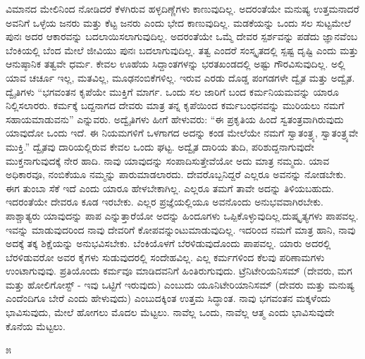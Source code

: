 ವಿಮಾನದ ಮೇಲಿನಿಂದ ನೋಡಿದರೆ ಕೆಳಗಿರುವ ಹಳ್ಳದಿಣ್ಣೆಗಳು ಕಾಣುವುದಿಲ್ಲ. ಅದರಂತೆಯೇ ಮನುಷ್ಯ ಉತ್ತಮನಾದರೆ ಅವನಿಗೆ ಒಳ್ಳೆಯ ಜನರು ಮತ್ತು ಕೆಟ್ಟ ಜನರು ಎಂದು ಭೇದ ಕಾಣುವುದಿಲ್ಲ. ಮಡಕೆಯನ್ನು ಒಂದು ಸಲ ಸುಟ್ಟಮೇಲೆ ಪುನಃ ಅದರ ಆಕಾರವನ್ನು ಬದಲಾಯಿಸಲಾಗುವುದಿಲ್ಲ. ಅದರಂತೆಯೇ ಒಮ್ಮೆ ದೇವರ ಸ್ಪರ್ಶವನ್ನು ಪಡೆದು ಜ್ಞಾನವೆಂಬ ಬೆಂಕಿಯಲ್ಲಿ ಬೆಂದ ಮೇಲೆ ಜೀವಿಯು ಪುನಃ ಬದಲಾಗುವುದಿಲ್ಲ. ತತ್ವ ಎಂದರೆ ಸಂಸ್ಕೃತದಲ್ಲಿ ಸ್ಪಷ್ಟ ದೃಷ್ಟಿ ಎಂದು ಮತ್ತು ಆನುಷ್ಠಾನಿಕ ತತ್ವವೇ ಧರ್ಮ. ಕೇವಲ ಊಹೆಯ ಸಿದ್ದಾಂತಗಳನ್ನು ಭರತಖಂಡದಲ್ಲಿ ಅಷ್ಟು ಗೌರವಿಸುವುದಿಲ್ಲ. ಅಲ್ಲಿ ಯಾವ ಚರ್ಚೂ ಇಲ್ಲ, ಮತವಿಲ್ಲ, ಮೂಢನಂಬಿಕೆಗಳಿಲ್ಲ. ಇರುವ ಎರಡು ದೊಡ್ಡ ಪಂಗಡಗಳೇ ದ್ವೈತ ಮತ್ತು ಅದ್ವೈತ. ದ್ವೈತಿಗಳು “ಭಗವಂತನ ಕೃಪೆಯೇ ಮುಕ್ತಿಗೆ ಮಾರ್ಗ. ಒಂದು ಸಲ ಜಾರಿಗೆ ಬಂದ ಕರ್ಮನಿಯಮವನ್ನು ಯಾರೂ ನಿಲ್ಲಿಸಲಾರರು. ಕರ್ಮಕ್ಕೆ ಬದ್ದನಾಗದ ದೇವರು ಮಾತ್ರ ತನ್ನ ಕೃಪೆಯಿಂದ ಕರ್ಮಬಂಧನವನ್ನು ಮುರಿಯಲು ನಮಗೆ ಸಹಾಯಮಾಡುವನು” ಎನ್ನುವರು. ಅದ್ವೈತಿಗಳು ಹೀಗೆ ಹೇಳುವರು: “ಈ ಪ್ರಕೃತಿಯ ಹಿಂದೆ ಸ್ವತಂತ್ರವಾಗಿರುವುದು ಯಾವುದೋ ಒಂದು ಇದೆ. ಈ ನಿಯಮಗಳಿಗೆ ಒಳಗಾಗದ ಅದನ್ನು ಕಂಡ ಮೇಲೆಯೇ ನಮಗೆ ಸ್ವಾತಂತ್ರ್ಯ, ಸ್ವಾತಂತ್ರ್ಯವೇ ಮುಕ್ತಿ.” ದ್ವೈತವು ದಾರಿಯಲ್ಲಿರುವ ಕೇವಲ ಒಂದು ಘಟ್ಟ. ಅದ್ವೈತ ದಾರಿಯ ತುದಿ, ಪರಿಶುದ್ದನಾಗುವುದೇ ಮುಕ್ತನಾಗುವುದಕ್ಕೆ ನೇರ ಹಾದಿ. ನಾವು ಯಾವುದನ್ನು ಸಂಪಾದಿಸುತ್ತೇವೆಯೋ ಅದು ಮಾತ್ರ ನಮ್ಮದು. ಯಾವ ಅಧಿಕಾರವೂ, ನಂಬಿಕೆಯೂ ನಮ್ಮನ್ನು ಪಾರುಮಾಡಲಾರದು. ದೇವರೊಬ್ಬನಿದ್ದರೆ ಎಲ್ಲರೂ ಅವನನ್ನು ನೋಡಬೇಕು. ಈಗ ತುಂಬಾ ಸೆಕೆ ಇದೆ ಎಂದು ಯಾರೂ ಹೇಳಬೇಕಾಗಿಲ್ಲ. ಎಲ್ಲರೂ ತಮಗೆ ತಾವೇ ಅದನ್ನು ತಿಳಿಯಬಹುದು. ಇದರಂತೆಯೇ ದೇವರೂ ಕೂಡ ಇರಬೇಕು. ಎಲ್ಲರ ಪ್ರಜ್ಞೆಯಲ್ಲಿಯೂ ಅವನೊಂದು ಅನುಭವವಾಗಿರಬೇಕು. ಪಾಶ್ಚಾತ್ಯರು ಯಾವುದನ್ನು ಪಾಪ ಎನ್ನುತ್ತಾರೆಯೋ ಅದನ್ನು ಹಿಂದೂಗಳು ಒಪ್ಪಿಕೊಳ್ಳುವುದಿಲ್ಲ.\break ದುಷ್ಕೃತ್ಯಗಳು ಪಾಪವಲ್ಲ. ಇವನ್ನು ಮಾಡುವುದರಿಂದ ನಾವು ದೇವರಿಗೆ ಕೋಪವನ್ನುಂಟುಮಾಡುವುದಿಲ್ಲ. ಇದರಿಂದ ನಮಗೆ ಮಾತ್ರ ಹಾನಿ, ನಾವು ಅದಕ್ಕೆ ತಕ್ಕ ಶಿಕ್ಷೆಯನ್ನು ಅನುಭವಿಸಬೇಕು. ಬೆಂಕಿಯೊಳಗೆ ಬೆರಳಿಡುವುದೊಂದು ಪಾಪವಲ್ಲ. ಯಾರು ಅದರಲ್ಲಿ ಬೆರಳಿಡುವರೋ ಅವರ ಕೈಗಳು ಸುಡುವುದರಲ್ಲಿ ಸಂದೇಹವಿಲ್ಲ. ಎಲ್ಲ ಕರ್ಮಗಳಿಂದ ಕೆಲವು ಪರಿಣಾಮಗಳು ಉಂಟಾಗುವುವು. ಪ್ರತಿಯೊಂದು ಕರ್ಮವೂ ಮಾಡಿದವನಿಗೆ ಹಿಂತಿರುಗುವುದು. ಟ್ರೆನಿಟೇರಿಯನಿಸಮ್ (ದೇವರು, ಮಗ ಮತ್ತು ಹೋಲಿಗೋಸ್ಟ್ - ಇವು ಒಟ್ಟಿಗೆ ಇರುವುದು) ಎಂಬುದು ಯೂನಿಟೇರಿಯಾನಿಸಮ್ (ದೇವರು ಮತ್ತು ಮನುಷ್ಯ ಎಂದೆಂದಿಗೂ ಬೇರೆ ಎಂದು ಹೇಳುವುದು) ಎಂಬುದಕ್ಕಿಂತ ಉತ್ತಮ ಸಿದ್ಧಾಂತ. ನಾವು ಭಗವಂತನ ಮಕ್ಕಳೆಂದು ಭಾವಿಸುವುದು, ಮೇಲೆ ಹೋಗಲು ಮೊದಲ ಮೆಟ್ಟಲು. ನಾವೆಲ್ಲ ಒಂದು, ನಾವೆಲ್ಲ ಆತ್ಮ ಎಂದು ಭಾವಿಸುವುದೇ ಕೊನೆಯ ಮೆಟ್ಟಲು.

\begin{center}
೫
\end{center}

